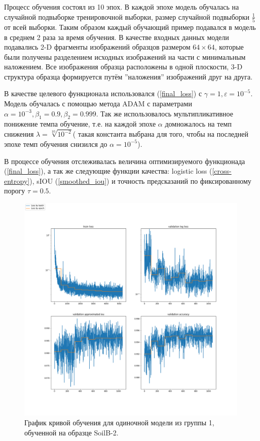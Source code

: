 \documentclass[12pt, a4paper]{extarticle}
\begin{document}
Процесс обучения состоял из 10 эпох. В каждой эпохе модель обучалась на случайной подвыборке тренировочной выборки, размер случайной подвыборки $\frac{1}{5}$ от всей выборки. Таким образом каждый обучающий пример подавался в модель в среднем 2 раза за время обучения. В качестве входных данных модели подавались 2-D фрагменты изображений образцов размером $64 \times 64$, которые были получены разделением исходных изображений на части с минимальным наложением.
Все изображения образца расположены в одной плоскости, 3-D структура образца формируется путём ''наложения'' изображений друг на друга.

В качестве целевого функционала использовался (\ref{final_loss}) с 
$\gamma=1, \varepsilon=10^{-5}$. Модель обучалась с помощью метода 
ADAM \cite{19} с параметрами \\
$\alpha=10^{-3}, \beta_1=0.9, \beta_2=0.999$. Так же использовалось 
мультипликативное понижение темпа обучение, т.е. на каждой эпохе 
$\alpha$ домножалось на темп снижения $\lambda=\sqrt[10]{10^{-2}}$( такая константа выбрана для того, чтобы на последней эпохе темп обучения снизился до $\alpha=10^{-5}$).

В процессе обучения отслеживалась величина оптимизируемого функционада (\ref{final_loss}), а так же следующие функции качества:
logistic loss (\ref{cross-entropy}), sIOU (\ref{smoothed_iou}) и 
точность предсказаний по фиксированному порогу $\tau=0.5$. 

\begin{figure}[h!]
\includegraphics[width=0.99\textwidth]{data/images/learning_progress_SoilB-2.png}
\caption{График кривой обучения для одиночной модели из группы 1, обученной на образце SoilB-2.}
\label{learning1}
\end{figure}
\end{document}
